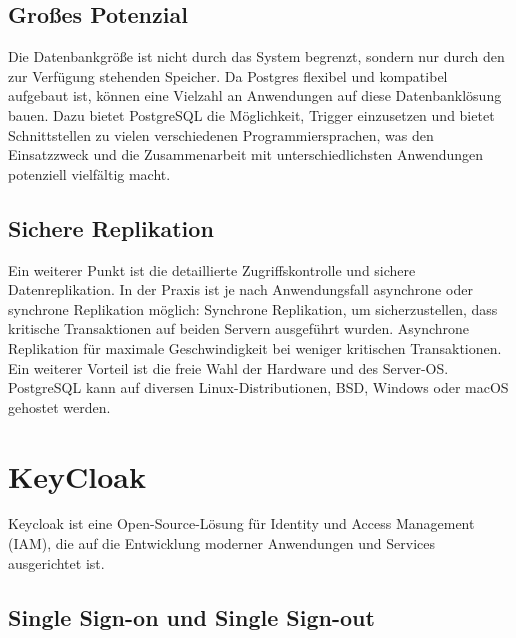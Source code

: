 \subsection{Großes Potenzial}

Die Datenbankgröße ist nicht durch das System begrenzt, sondern nur durch den zur Verfügung stehenden Speicher. Da Postgres flexibel und kompatibel aufgebaut ist, 
können eine Vielzahl an Anwendungen auf diese Datenbanklösung bauen. Dazu bietet PostgreSQL die Möglichkeit, 
Trigger einzusetzen und bietet Schnittstellen zu vielen verschiedenen Programmiersprachen, was den Einsatzzweck und die Zusammenarbeit mit unterschiedlichsten Anwendungen potenziell vielfältig macht.
\cite{sysarch-postgresql-1}

\subsection{Sichere Replikation}

Ein weiterer Punkt ist die detaillierte Zugriffskontrolle und sichere Datenreplikation. In der Praxis ist je nach Anwendungsfall asynchrone oder synchrone Replikation möglich: 
Synchrone Replikation, um sicherzustellen, dass kritische Transaktionen auf beiden Servern ausgeführt wurden. Asynchrone Replikation für maximale Geschwindigkeit bei weniger kritischen Transaktionen. 
Ein weiterer Vorteil ist die freie Wahl der Hardware und des Server-OS. PostgreSQL kann auf diversen Linux-Distributionen, BSD, Windows oder macOS 
gehostet werden.
\cite{sysarch-postgresql-1}

\section{KeyCloak}

Keycloak ist eine Open-Source-Lösung für Identity und Access Management (IAM), die auf die Entwicklung moderner Anwendungen und Services ausgerichtet ist.
\cite{sysarch-keycloak-1}

\subsection{Single Sign-on und Single Sign-out}

